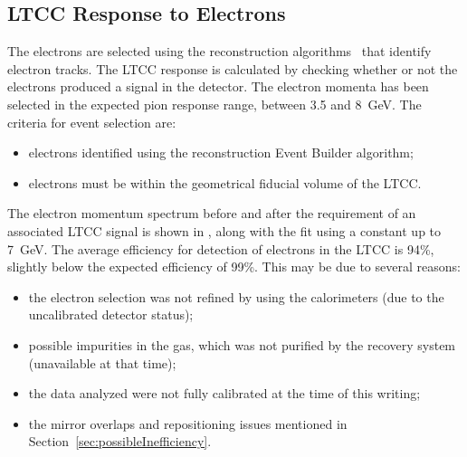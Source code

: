\subsection{LTCC Response to Electrons}
\label{sec:elecResponse}

The electrons are selected using the reconstruction algorithms~\cite{recon-nim} that identify electron tracks. The
LTCC response is calculated by checking whether or not the electrons produced a signal in the detector. The electron
momenta has been selected in the expected pion response range, between 3.5 and 8~GeV. The criteria for event
selection are:

\begin{itemize}
\item electrons identified using the reconstruction Event Builder algorithm;
\item electrons must be within the geometrical fiducial volume of the LTCC.
\end{itemize}

The electron momentum spectrum before and after the requirement of an associated LTCC signal is shown in
, along with the fit using a constant up to 7~GeV. The average efficiency for detection of
electrons in the LTCC is 94\%, slightly below the expected efficiency of 99\%. This may be due to
several reasons:

\begin{itemize}
\item the electron selection was not refined by using the calorimeters (due to the uncalibrated detector status);
\item possible impurities in the gas, which was not purified by the recovery system (unavailable at that time);
\item the data analyzed were not fully calibrated at the time of this writing;
\item the mirror overlaps and repositioning issues mentioned in Section~\ref{sec:possibleInefficiency}.
\end{itemize}


